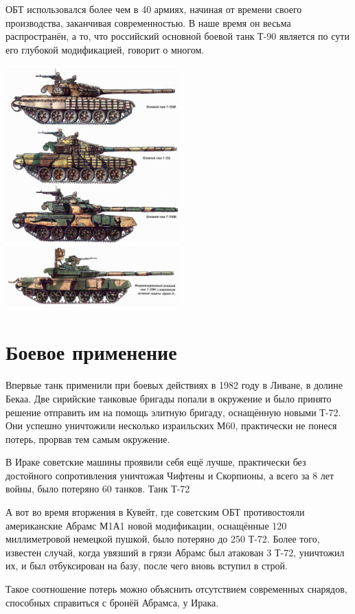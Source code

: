 ОБТ использовался более чем в 40 армиях, начиная от времени своего производства, заканчивая современностью. В наше время он весьма распространён, а то, что российский основной боевой танк Т-90 является по сути его глубокой модификацией, говорит о многом.

    \begin{center}
	\includegraphics[width=0.5\textwidth]{images/tank2.jpg}
    \end{center}

\section{Боевое применение}

	Впервые танк применили при боевых действиях в 1982 году в Ливане, в долине Бекаа. Две сирийские танковые бригады попали в окружение и было принято решение отправить им на помощь элитную бригаду, оснащённую новыми Т-72. Они успешно уничтожили несколько израильских М60, практически не понеся потерь, прорвав тем самым окружение.

В Ираке советские машины проявили себя ещё лучше, практически без достойного сопротивления уничтожая Чифтены и Скорпионы, а всего за 8 лет войны, было потеряно 60 танков.
Танк Т-72

А вот во время вторжения в Кувейт, где советским ОБТ противостояли американские Абрамс М1А1 новой модификации, оснащённые 120 миллиметровой немецкой пушкой, было потеряно до 250 Т-72. Более того, известен случай, когда увязший в грязи Абрамс был атакован 3 Т-72, уничтожил их, и был отбуксирован на базу, после чего вновь вступил в строй.

Такое соотношение потерь можно объяснить отсутствием современных снарядов, способных справиться с бронёй Абрамса, у Ирака.

